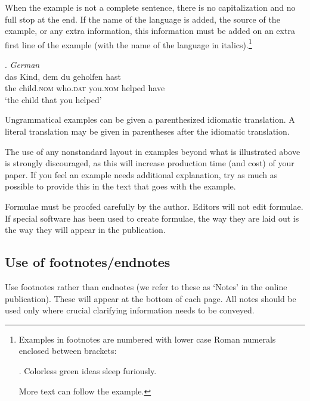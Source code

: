 \documentclass[charis,linguex,biblatex]{glossa}
\begin{document}
When the example is not a complete sentence, there is no capitalization and no full stop at the end. If the name of the language is added, the source of the example, or any extra information, this information must be added on an extra first line of the example (with the name of the language in italics).\footnote{Examples in footnotes are numbered with lower case Roman numerals enclosed between brackets:

\ex. Colorless green ideas sleep furiously.

More text can follow the example.}

\ex. \textit{German} \citep{coetsem:2000}\\ %
\gll das Kind, dem du geholfen hast\\  %
the child.\textsc{nom} who.\textsc{dat} you.\textsc{nom}  helped have\\ %
\glt `the child that you helped' %

Ungrammatical examples can be given a parenthesized idiomatic translation. A literal translation may be given in parentheses after the idiomatic translation.

The use of any nonstandard layout in examples beyond what is illustrated above is strongly discouraged, as this will increase production time (and cost) of your paper. If you feel an example needs additional explanation, try as much as possible to provide this in the text that goes with the example.

Formulae must be proofed carefully by the author. Editors will not edit formulae. If special software has been used to create formulae, the way they are laid out is the way they will appear in the publication.

\subsection{Use of footnotes/endnotes}\label{fn}

Use footnotes rather than endnotes (we refer to these as ‘Notes’ in the online publication). These will appear at the bottom of each page. All notes should be used only where crucial clarifying information needs to be conveyed. 
\end{document}
